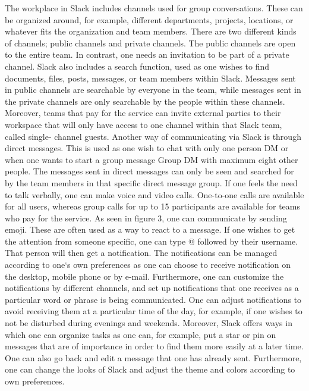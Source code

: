 The workplace in Slack includes channels used for group conversations. These can be organized around, for example, different departments, projects, locations, or whatever fits the organization and team members. There are two different kinds of channels; public channels and private channels. The public channels are open to the entire team. In contrast, one needs an invitation to be part of a private channel. Slack also includes a search function, used as one wishes to find documents, files, posts, messages, or team members within Slack. Messages sent in public channels are searchable by everyone in the team, while messages sent in the private channels are only searchable by the people within these channels. Moreover, teams that pay for the service can invite external parties to their workspace that will only have access to one channel within that Slack team, called single- channel guests.
Another way of communicating via Slack is through direct messages. This is used as one wish to chat with only one person DM or when one wants to start a group message Group DM with maximum eight other people. The messages sent in direct messages can only be seen and searched for by the team members in that specific direct message group. If one feels the need to talk verbally, one can make voice and video calls. One-to-one calls are available for all users, whereas group calls for up to 15 participants are available for teams who pay for the service.
As seen in figure 3, one can communicate by sending emoji. These are often used as a way to react to a message. If one wishes to get the attention from someone specific, one can type @ followed by their username. That person will then get a notification. The notifications can be managed according to one‘s own preferences as one can choose to receive notification on the desktop, mobile phone or by e-mail. Furthermore, one can customize the notifications by different channels, and set up notifications that one receives as a particular word or phrase is being communicated. One can adjust notifications to avoid receiving them at a particular time of the day, for example, if one wishes to not be disturbed during evenings and weekends. Moreover, Slack offers ways in which one can organize tasks as one can, for example, put a star or pin on messages that are of importance in order to find them more easily at a later time. One can also go back and edit a message that one has already sent. Furthermore, one can change the looks of Slack and adjust the theme and colors according to own preferences.

